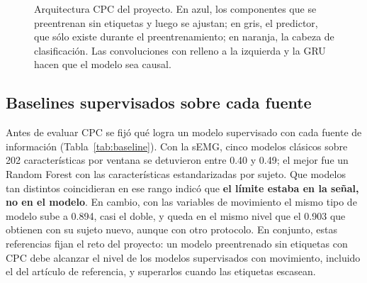 \documentclass[letterpaper,11pt]{article}
\begin{document}
\begin{figure}[H]
\centering
{}
\caption{Arquitectura CPC del proyecto. En azul, los componentes que se preentrenan sin etiquetas y luego se ajustan; en gris, el predictor, que sólo existe durante el preentrenamiento; en naranja, la cabeza de clasificación. Las convoluciones con relleno a la izquierda y la GRU hacen que el modelo sea causal.}
\label{fig:arquitectura}
\end{figure}

\subsection{Baselines supervisados sobre cada fuente}
\label{sec:semg}
Antes de evaluar CPC se fijó qué logra un modelo supervisado con cada fuente de información (Tabla~\ref{tab:baseline}). Con la sEMG, cinco modelos clásicos sobre 202 características por ventana se detuvieron entre 0.40 y 0.49; el mejor fue un Random Forest \parencite{breiman2001} con las características estandarizadas por sujeto. Que modelos tan distintos coincidieran en ese rango indicó que \textbf{el límite estaba en la señal, no en el modelo}. En cambio, con las variables de movimiento el mismo tipo de modelo sube a 0.894, casi el doble, y queda en el mismo nivel que el 0.903 que \textcite{bassani2025} obtienen con su sujeto nuevo, aunque con otro protocolo. En conjunto, estas referencias fijan el reto del proyecto: un modelo preentrenado sin etiquetas con CPC debe alcanzar el nivel de los modelos supervisados con movimiento, incluido el del artículo de referencia, y superarlos cuando las etiquetas escasean.
\end{document}
